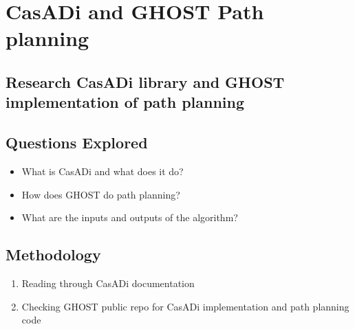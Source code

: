 \section*{CasADi and GHOST Path planning}

\subsection*{Research CasADi library and GHOST implementation of path planning}

\subsection*{Questions Explored}
\begin{itemize}
    \item What is CasADi and what does it do?
    \item How does GHOST do path planning?
    \item What are the inputs and outputs of the algorithm?
\end{itemize}

\subsection*{Methodology}
\begin{enumerate}
    \item Reading through CasADi documentation
    \item Checking GHOST public repo for CasADi implementation and path planning code
\end{enumerate}

